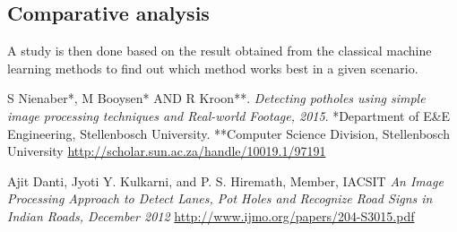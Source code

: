 \documentclass[12pt,a4paper]{article}
\begin{document}
\subsection{Comparative analysis}
A study is then done based on the result obtained from the classical machine learning methods to find out which method works best in a given scenario.

\begin{thebibliography}{9}
S Nienaber*, M Booysen* AND R Kroon**.
\textit{Detecting potholes using simple image processing techniques and Real-world Footage, 2015}. 
*Department of E\&E Engineering, Stellenbosch University.
**Computer Science Division, Stellenbosch University
\url{http://scholar.sun.ac.za/handle/10019.1/97191}
 
Ajit Danti, Jyoti Y. Kulkarni, and P. S. Hiremath, Member, IACSIT
\textit{An Image Processing Approach to Detect Lanes, Pot Holes and Recognize Road Signs in Indian Roads, December 2012}
\url{http://www.ijmo.org/papers/204-S3015.pdf}
\end{thebibliography}
\end{document}
